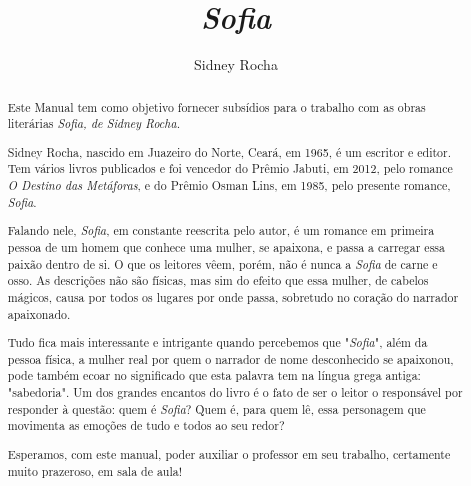 \documentclass[12pt]{extarticle}
\begin{document}
\newcommand{\AutorLivro}{Sidney Rocha}
\newcommand{\TituloLivro}{\textit{Sofia}}
\newcommand{\Tema}{Ficção, mistério e fantasia}
\newcommand{\Genero}{Romance}
\newcommand{\imagemCapa}{./images/PNLD0054-01.png}
\newcommand{\issnppub}{---}
\newcommand{\issnepub}{---}
\newcommand{\colaborador}{\textbf{Fulano de Tal} é uma pessoa incrível e vai
fazer um bom serviço.}


\title{\TituloLivro} \author{\AutorLivro} \def\authornotes{\colaborador}

\date{} \maketitle

\baselineskip\par

\begin{abstract}

Este Manual tem como objetivo fornecer subsídios para o trabalho com as obras
  literárias \emph{\textit{Sofia}, de Sidney Rocha.}

Sidney Rocha, nascido em Juazeiro do Norte, Ceará, em 1965, é um escritor e
  editor. Tem vários livros publicados e foi vencedor do Prêmio Jabuti, em
  2012, pelo romance \textit{O Destino das Metáforas}, e do Prêmio Osman Lins,
  em 1985, pelo presente romance, \textit{Sofia}.

Falando nele, \textit{Sofia}, em constante reescrita pelo autor, é um romance
  em primeira pessoa de um homem que conhece uma mulher, se apaixona, e passa a
  carregar essa paixão dentro de si. O que os leitores vêem, porém, não é nunca
  a \textit{Sofia} de carne e osso. As descrições não são físicas, mas sim do efeito que
  essa mulher, de cabelos mágicos, causa por todos os lugares por onde passa,
  sobretudo no coração do narrador apaixonado. 

Tudo fica mais interessante e intrigante quando percebemos que "\textit{Sofia}", além da
  pessoa física, a mulher real por quem o narrador de nome desconhecido se
  apaixonou, pode também ecoar no significado que esta palavra tem na língua
  grega antiga: "sabedoria". Um dos grandes encantos do livro é o fato de ser o
  leitor o responsável por responder à questão: quem é \textit{Sofia}? Quem é, para quem
  lê, essa personagem que movimenta as emoções de tudo e todos ao seu redor?

Esperamos, com este manual, poder auxiliar o professor em seu trabalho,
  certamente muito prazeroso, em sala de aula!


\end{abstract}
\end{document}
